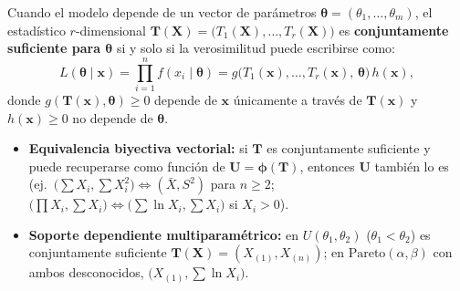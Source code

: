 \documentclass[10pt,a4paper]{article}
\begin{document}
\begin{thmbox}[frametitle={Suficiencia conjunta y Criterio de Factorización multiparamétrico}]
Cuando el modelo depende de un vector de parámetros $\boldsymbol{\theta} = (\theta_1, \dots, \theta_m)$, el estadístico $r$-dimensional $\mathbf{T}(\mathbf{X}) = \big(T_1(\mathbf{X}), \dots, T_r(\mathbf{X})\big)$ es \textbf{conjuntamente suficiente para $\boldsymbol{\theta}$} si y solo si la verosimilitud puede escribirse como:
\[
L(\boldsymbol{\theta} \mid \mathbf{x}) = \prod_{i=1}^n f(x_i \mid \boldsymbol{\theta}) = g\big(T_1(\mathbf{x}), \dots, T_r(\mathbf{x}),\,\boldsymbol{\theta}\big)\,h(\mathbf{x}),
\]
donde $g(\mathbf{T}(\mathbf{x}), \boldsymbol{\theta}) \ge 0$ depende de $\mathbf{x}$ únicamente a través de $\mathbf{T}(\mathbf{x})$ y $h(\mathbf{x}) \ge 0$ no depende de $\boldsymbol{\theta}$.
\begin{itemize}
  \item \textbf{Equivalencia biyectiva vectorial:} si $\mathbf{T}$ es conjuntamente suficiente y puede recuperarse como función de $\mathbf{U} = \boldsymbol{\phi}(\mathbf{T})$, entonces $\mathbf{U}$ también lo es (ej.\ $\big(\sum X_i, \sum X_i^2\big) \iff (\bar X, S^2)$ para $n \ge 2$; $\big(\prod X_i, \sum X_i\big) \iff \big(\sum \ln X_i, \sum X_i\big)$ si $X_i > 0$).
  \item \textbf{Soporte dependiente multiparamétrico:} en $U(\theta_1, \theta_2)$ ($\theta_1 < \theta_2$) es conjuntamente suficiente $\mathbf{T}(\mathbf{X}) = (X_{(1)}, X_{(n)})$; en $\text{Pareto}(\alpha, \beta)$ con ambos desconocidos, $\big(X_{(1)}, \sum \ln X_i\big)$.
\end{itemize}
\end{thmbox}
\end{document}
